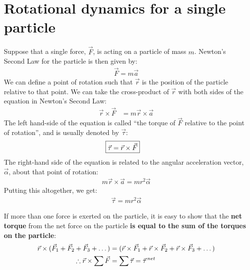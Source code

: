 \section{Rotational dynamics for a single particle}
Suppose that a single force, $\vec F$, is acting on a particle of mass $m$.  Newton's Second Law for the particle is then given by:
\begin{align*}
\vec F = m \vec a
\end{align*}
We can define a point of rotation such that $\vec r$ is the position of the particle relative to that point. We can take the cross-product of $\vec r$ with both sides of the equation in Newton's Second Law:
\begin{align*}
\vec r \times \vec F &= m \vec r \times \vec a
\end{align*}
The left hand-side of the equation is called ``the torque of $\vec F$ relative to the point of rotation'', and is usually denoted by $\vec \tau$:
\begin{align}
\Aboxed{\vec \tau = \vec r \times \vec F}
\end{align}
The right-hand side of the equation is related to the angular acceleration vector, $\vec \alpha$, about that point of rotation:
\begin{align*}
 m \vec r \times \vec a = mr^2\vec\alpha
\end{align*}
Putting this altogether, we get:
\begin{align*}
\vec\tau = mr^2 \vec\alpha
\end{align*}

If more than one force is exerted on the particle, it is easy to show that the \textbf{net torque} from the net force on the particle \textbf{is equal to the sum of the torques on the particle}:
\begin{align*}
\vec r \times (\vec F_1 + \vec F_2 + \vec F_3 + \dots) &=  (\vec r \times \vec F_1 + \vec r \times \vec F_2 + \vec r \times \vec F_3 + \dots) \\
\therefore \vec r \times \sum \vec F &= \sum \vec \tau = \pvec \tau^{net}
\end{align*}

